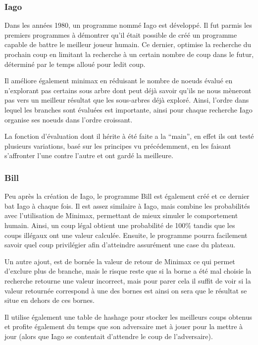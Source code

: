 \documentclass[10pt,a4paper]{article}
\begin{document}
\subsubsection {Iago}
Dans les années 1980, un programme nommé Iago est développé. Il fut parmis les premiers programmes à démontrer qu'il était possible de créé un programme capable de battre le meilleur joueur humain.
Ce dernier, optimise la recherche du prochain coup en limitant la recherche à un certain nombre de coup dans le futur, déterminé par le temps alloué pour ledit coup.\newline

Il améliore également minimax en réduisant le nombre de noeuds évalué en n'explorant pas certains sous arbre dont peut déjà savoir qu'ils ne nous mèneront pas vers un meilleur résultat que les sous-arbres déjà exploré. Ainsi, l'ordre dans lequel les branches sont évaluées est importante, ainsi pour chaque recherche Iago organise ses noeuds dans l'ordre croissant.\newline

La fonction d'évaluation dont il hérite à été faite a la ``main'', en effet ils ont testé plusieurs variations, basé sur les principes vu précédemment, en les faisant s'affronter l'une contre l'autre et ont gardé la meilleure.



\subsubsection {Bill}
Peu après la création de Iago, le programme Bill est également créé et ce dernier bat Iago à chaque fois.
Il est assez similaire à Iago, mais combine les probabilités avec l'utilisation de Minimax, permettant de mieux simuler le comportement humain. Ainsi, un coup légal obtient une probabilité de 100\% tandis que les coups illégaux ont une valeur calculée. Ensuite, le programme pourra facilement savoir quel coup privilégier afin d'atteindre assurément une case du plateau. \newline

Un autre ajout, est de bornée la valeur de retour de Minimax ce qui permet d'exclure plus de branche, mais le risque reste que si la borne a été mal choisie la recherche retourne une valeur incorrect, mais pour parer cela il suffit de voir si la valeur retournée correspond à une des bornes est ainsi on sera que le résultat se situe en dehors de ces bornes.
\newline

Il utilise également une table de hashage pour stocker les meilleurs coups obtenus %
 et profite également du temps que son adversaire met à jouer pour la mettre à jour (alors que Iago se contentait d'attendre le coup de l'adversaire). 
\end{document}
